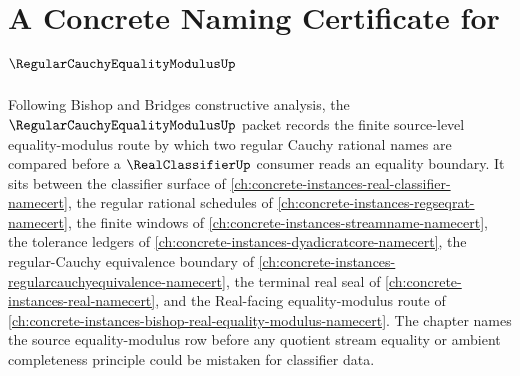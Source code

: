 \chapter{A Concrete Naming Certificate for $\RegularCauchyEqualityModulusUp$}
\label{ch:concrete-instances-regular-cauchy-equality-modulus-namecert}

Following Bishop and Bridges constructive analysis, the $\RegularCauchyEqualityModulusUp$ packet records the finite source-level equality-modulus route by which two regular Cauchy rational names are compared before a $\RealClassifierUp$ consumer reads an equality boundary. It sits between the classifier surface of \autoref{ch:concrete-instances-real-classifier-namecert}, the regular rational schedules of \autoref{ch:concrete-instances-regseqrat-namecert}, the finite windows of \autoref{ch:concrete-instances-streamname-namecert}, the tolerance ledgers of \autoref{ch:concrete-instances-dyadicratcore-namecert}, the regular-Cauchy equivalence boundary of \autoref{ch:concrete-instances-regularcauchyequivalence-namecert}, the terminal real seal of \autoref{ch:concrete-instances-real-namecert}, and the Real-facing equality-modulus route of \autoref{ch:concrete-instances-bishop-real-equality-modulus-namecert}. The chapter names the source equality-modulus row before any quotient stream equality or ambient completeness principle could be mistaken for classifier data.

